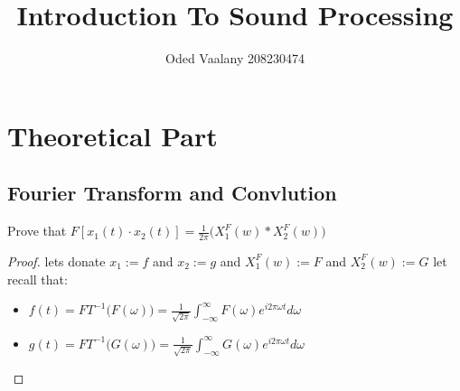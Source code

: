 \documentclass{article}
\title{Introduction To Sound Processing}
\author{Oded Vaalany 208230474}
\begin{document}
\maketitle

\section{Theoretical Part}
\subsection{Fourier Transform and Convlution}
Prove that $F[x_1(t)\cdot x_2(t)]= \frac{1}{2\pi} \big ( X^F_1(w)\ast X^F_2 (w)\big)$
\begin{proof}

lets donate $x_1:=f$ and $x_2:=g$ and $X^F_1(w):=F$ and $X^F_2(w):=G$ 
\newline
let recall that: 
\begin{itemize}
    \item $f(t) = FT^{-1}\big(F(\omega)\big) = \frac{1}{\sqrt{2\pi}}\int^{\infty}_{-\infty}F(\omega)e^{i2\pi \omega t}d \omega$
    \item $g(t) = FT^{-1}\big(G(\omega)\big) = \frac{1}{\sqrt{2\pi}}\int^{\infty}_{-\infty}G(\omega)e^{i2\pi \omega t}d \omega$
\end{itemize}


\end{proof}
\end{document}
